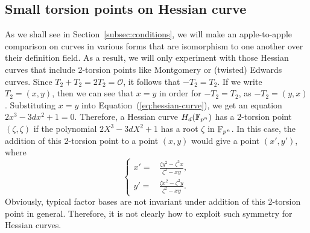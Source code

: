 \subsection{Small torsion points on Hessian curve}
%
As we shall see in Section~\ref{subsec:conditions}, we will make an
apple-to-apple comparison on curves in various forms that are
isomorphism to one another over their definition field.
%
As a result, we will only experiment with those Hessian curves that
include 2-torsion points like Montgomery or (twisted) Edwards curves.
%
Since $T_2+T_2=2T_2=\mathcal O$, it follows that $-T_2=T_2$.
%
If we write $T_2=(x,y)$, then we can see that $x=y$ in order for
$-T_2=T_2$, as $-T_2=(y,x)$.
%
Substituting $x=y$ into Equation~(\ref{eq:hessian-curve}), we get an
equation $2x^3-3dx^2+1=0$.
%
Therefore, a Hessian curve $H_d(\mathbb F_{p^n})$ has a 2-torsion point
$(\zeta,\zeta)$ if the polynomial $2X^3 - 3dX^2 + 1$ has a root
$\zeta$ in $\mathbb F_{p^n}$.
%
In this case, the addition of this 2-torsion point to a point $(x,y)$
would give a point $(x',y')$, where
\[ \left\{\begin{aligned}
x' = & \frac{\zeta y^2 - \zeta^2x}{\zeta^2 - xy}, \\
y' = & \frac{\zeta x^2 - \zeta^2y}{\zeta^2 - xy}.
\end{aligned}\right. \]
%
Obviously, typical factor bases are not invariant under addition of
this 2-torsion point in general.
%
Therefore, it is not clearly how to exploit such symmetry for Hessian
curves.

